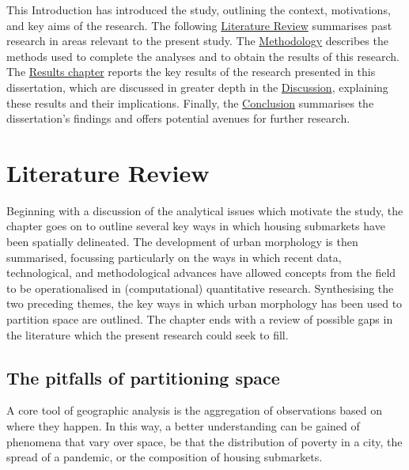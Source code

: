 \documentclass[a4paper, nobind]{templates/ociamthesis}
\begin{document}
This Introduction has introduced the study, outlining the context, motivations, and key aims of the research. The following \protect\hyperlink{lit-review}{Literature Review} summarises past research in areas relevant to the present study. The \protect\hyperlink{methods}{Methodology} describes the methods used to complete the analyses and to obtain the results of this research. The \protect\hyperlink{results}{Results chapter} reports the key results of the research presented in this dissertation, which are discussed in greater depth in the \protect\hyperlink{discussion}{Discussion}, explaining these results and their implications. Finally, the \protect\hyperlink{conclusion}{Conclusion} summarises the dissertation's findings and offers potential avenues for further research.

\hypertarget{lit-review}{%
\chapter{Literature Review}\label{lit-review}}

\minitoc 

Beginning with a discussion of the analytical issues which motivate the study, the chapter goes on to outline several key ways in which housing submarkets have been spatially delineated. The development of urban morphology is then summarised, focussing particularly on the ways in which recent data, technological, and methodological advances have allowed concepts from the field to be operationalised in (computational) quantitative research. Synthesising the two preceding themes, the key ways in which urban morphology has been used to partition space are outlined. The chapter ends with a review of possible gaps in the literature which the present research could seek to fill.

\hypertarget{the-pitfalls-of-partitioning-space}{%
\section{The pitfalls of partitioning space}\label{the-pitfalls-of-partitioning-space}}

A core tool of geographic analysis is the aggregation of observations based on where they happen. In this way, a better understanding can be gained of phenomena that vary over space, be that the distribution of poverty in a city, the spread of a pandemic, or the composition of housing submarkets.
\end{document}
